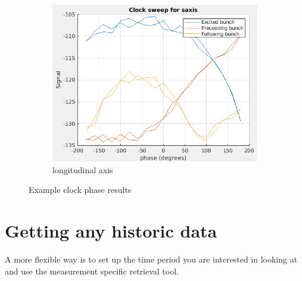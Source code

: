 \documentclass{report}
\begin{document}
\begin{figure}[hbt]
    \begin{subfigure}[b]{0.45\textwidth}
        \includegraphics[width=\textwidth]{vlr_clock_phase_scan_s.png}
        \caption{longitudinal axis}
        \label{fig:clock_phase_example_z}
    \end{subfigure}
    \caption{Example clock phase results}
    \label{fig:clock_phase_example}
\end{figure}

\clearpage
\section{Getting any historic data} 

A more flexible way is to set up the time period you are interested in looking at and use the measurement specific retrieval tool. 
\end{document}
